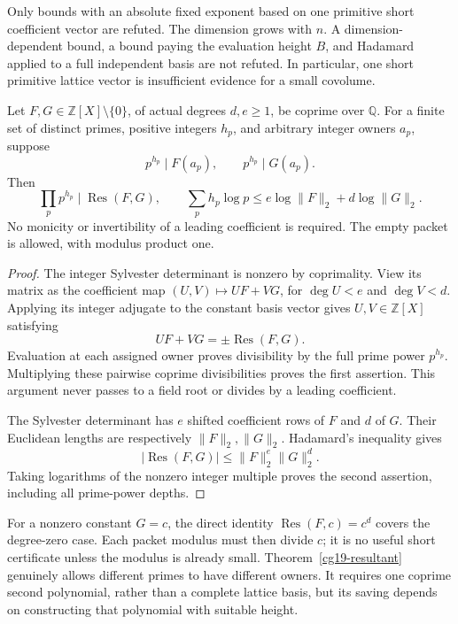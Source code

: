 Only bounds with an absolute fixed exponent based on one primitive
short coefficient vector are refuted. The dimension grows with \(n\).
A dimension-dependent bound, a bound paying the evaluation height
\(B\), and Hadamard applied to a full independent basis are not
refuted. In particular, one short primitive lattice vector is
insufficient evidence for a small covolume.

\begin{theorem}
\label{cg19-resultant}
Let \(F,G\in\mathbb Z[X]\setminus\{0\}\), of actual degrees
\(d,e\ge1\), be coprime over \(\mathbb Q\).
For a finite set of distinct primes, positive integers \(h_p\),
and arbitrary integer owners \(a_p\), suppose
\[
 p^{h_p}\mid F(a_p),\qquad p^{h_p}\mid G(a_p).
\]
Then
\begin{equation}
 \prod_p p^{h_p}\mid\operatorname{Res}(F,G),\qquad
 \sum_p h_p\log p\le e\log\|F\|_2+d\log\|G\|_2.
 \label{cg19-resultant-bound}
\end{equation}
No monicity or invertibility of a leading coefficient is required.
The empty packet is allowed, with modulus product one.
\end{theorem}
\begin{proof}
The integer Sylvester determinant is nonzero by coprimality.
View its matrix as the coefficient map
\((U,V)\mapsto UF+VG\), for \(\deg U<e\) and \(\deg V<d\).
Applying its integer adjugate to the constant basis vector gives
\(U,V\in\mathbb Z[X]\) satisfying
\[
 UF+VG=\pm\operatorname{Res}(F,G).
\]
Evaluation at each assigned owner proves divisibility by the full
prime power \(p^{h_p}\). Multiplying these pairwise coprime
divisibilities proves the first assertion. This argument never
passes to a field root or divides by a leading coefficient.

The Sylvester determinant has \(e\) shifted coefficient rows of
\(F\) and \(d\) of \(G\). Their Euclidean lengths are respectively
\(\|F\|_2,\|G\|_2\). Hadamard's inequality gives
\[
 |\operatorname{Res}(F,G)|\le\|F\|_2^e\|G\|_2^d.
\]
Taking logarithms of the nonzero integer multiple proves the
second assertion, including all prime-power depths.
\end{proof}

For a nonzero constant \(G=c\), the direct identity
\(\operatorname{Res}(F,c)=c^d\) covers the degree-zero case.
Each packet modulus must then divide \(c\); it is no useful short
certificate unless the modulus is already small.
Theorem~\ref{cg19-resultant} genuinely allows different primes
to have different owners. It requires one coprime second
polynomial, rather than a complete lattice basis, but its saving
depends on constructing that polynomial with suitable height.

